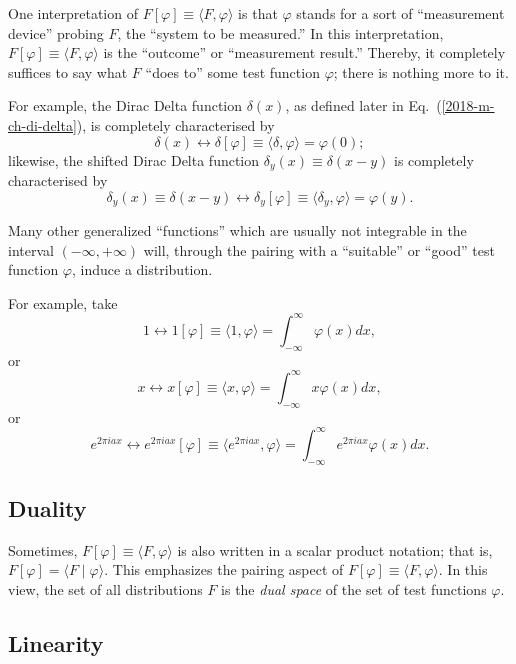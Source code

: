 One interpretation of
$F[\varphi ]\equiv \langle F , \varphi \rangle $
is that  $\varphi$ stands for a sort of ``measurement device'' probing
$F$, the ``system to be measured.''
In this interpretation,
$F[\varphi ]\equiv \langle F , \varphi \rangle $
is the ``outcome'' or ``measurement result.''
Thereby, it completely suffices to say what $F$ ``does to'' some test function $\varphi$; there is nothing more to it.

{
\color{blue}
\bexample
For example, the Dirac Delta function $\delta(x)$, as defined later in Eq.~(\ref{2018-m-ch-di-delta}),
is completely characterised by
$$\delta(x)  \longleftrightarrow \delta [\varphi ]\equiv \langle \delta , \varphi \rangle =\varphi (0);$$
likewise,
the shifted Dirac Delta function $\delta_y(x)\equiv \delta (x-y)$ is completely characterised by
$$\delta_y (x) \equiv \delta(x-y) \longleftrightarrow \delta_y
[\varphi ]\equiv \langle \delta_y , \varphi \rangle =\varphi (y).$$
\eexample
}

Many other generalized ``functions'' which are usually not integrable in the interval
$( -\infty , +\infty )$ will, through the pairing with a
``suitable'' or ``good'' test function $\varphi$,
induce a distribution.

{
\color{blue}
\bexample
For example, take
$$1 \longleftrightarrow 1 [\varphi ]\equiv \langle 1 , \varphi \rangle
=\int_{-\infty}^\infty
\varphi (x)
dx  , $$
or
$$x \longleftrightarrow x [\varphi ]\equiv \langle x , \varphi \rangle =\int_{-\infty}^\infty
x\varphi (x)
dx,$$
or
$$e^{2\pi i ax} \longleftrightarrow e^{2\pi i ax} [\varphi ]\equiv \langle e^{2\pi i ax}  ,
\varphi \rangle
=\int_{-\infty}^\infty
e^{2\pi i ax} \varphi (x)
dx  .$$
\eexample
}

\subsection{Duality}

Sometimes, $F[\varphi ]\equiv \langle F , \varphi \rangle $   is also written in a scalar product notation; that is,
$F[\varphi] =\langle F \mid \varphi \rangle$.
This emphasizes the pairing aspect of $F[\varphi ]\equiv \langle F , \varphi \rangle $.
In this view, the set of all distributions $F$ is the {\em dual space} of the set of test functions $\varphi$.


\subsection{Linearity}


